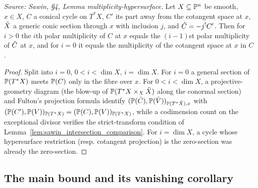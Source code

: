 \begin{lemma}
  \label{lem:sawin_multiplicity_hypersurface}
  \textit{Source: Sawin, §4, Lemma multiplicity-hypersurface.}
  Let $X\subseteq\mathbb{P}^n$ be smooth, $x\in X$, $C$ a conical cycle on $T^*X$, $C'$ its
  part away from the cotangent space at $x$, $\tilde{X}$ a generic conic section
  through $x$ with inclusion $j$, and $\tilde{C}=-j^!C'$.  Then for $i>0$ the
  $i$th polar multiplicity of $C$ at $x$ equals the $(i-1)$st polar multiplicity
  of $\tilde{C}$ at $x$, and for $i=0$ it equals the multiplicity of the
  cotangent space at $x$ in $C$.
\end{lemma}
\begin{proof}
  Split into $i=0$, $0<i<\dim X$, $i=\dim X$.  For $i=0$ a general section of
  $\mathbb{P}(T^*X)$ meets $\mathbb{P}(C)$ only in the fibre over $x$.  For $0<i<\dim X$, a
  projective-geometry diagram (the blow-up of $\mathbb{P}(T^*X\times_X\tilde{X})$ along
  the conormal section) and Fulton's projection formula identify
  $(\mathbb{P}(\tilde{C}),\mathbb{P}(\tilde{V}))_{\mathbb{P}(T^*\tilde{X}),x}$ with
  $(\mathbb{P}(C'),\mathbb{P}(V))_{\mathbb{P}(T^*X)}=(\mathbb{P}(C),\mathbb{P}(V))_{\mathbb{P}(T^*X)}$, while a codimension
  count on the exceptional divisor verifies the strict-transform condition of
  Lemma~\ref{lem:sawin_intersection_comparison}.  For $i=\dim X$, a cycle whose
  hypersurface restriction (resp. cotangent projection) is the zero-section was
  already the zero-section.
\end{proof}

\subsection{The main bound and its vanishing corollary}

